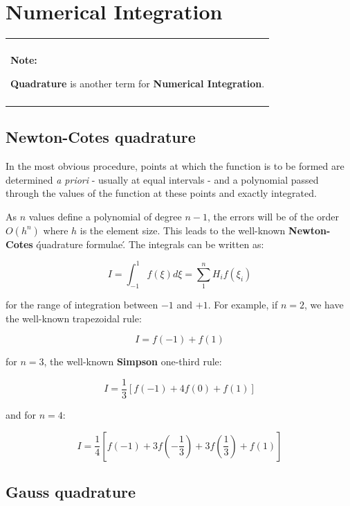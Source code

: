 \documentclass[10pt,b5paper,titlepage]{book}
\newenvironment{bbox}[1][0.96]
{
    \begin{center}
        \begin{tabular}{|p{#1\textwidth}|}
            \hline\\
}
{
            \\\\\hline
        \end{tabular}
    \end{center}
}
\begin{document}
\section{Numerical Integration}

\begin{bbox}
    \textbf{Note:}

    \textbf{Quadrature} is another term for \textbf{Numerical Integration}.
\end{bbox}


\subsection{Newton-Cotes quadrature}
In the most obvious procedure, points at which the function is to be formed are
determined \textit{a priori} - usually at equal intervals - and a polynomial
passed through the values of the function at these points and exactly integrated.

As $ n $ values define a polynomial of degree $ n - 1 $, the errors will be
of the order $ O(h^n) $ where $ h $ is the element size. This leads to the
well-known \textbf{Newton-Cotes} \'quadrature formulae\'. The integrals can be
written as:

\begin{equation}
    I = \int_{-1}^{1} f(\xi) d\xi = \sum_1^n H_i f(\xi_i)
\end{equation}

for the range of integration between $ -1 $ and $ +1 $. For example, if $ n = 2 $,
we have the well-known trapezoidal rule:

\begin{equation}
    I = f(-1) + f(1)
\end{equation}

for $ n = 3 $, the well-known \textbf{Simpson} one-third rule:

\begin{equation}
    I = \frac{1}{3} \left[ f(-1) + 4f(0) + f(1) \right]
\end{equation}

and for $ n = 4 $:

\begin{equation}
    I = \frac{1}{4} \left[f(-1) + 3f(-\frac{1}{3}) + 3f(\frac{1}{3}) + f(1) \right]
\end{equation}


\subsection{Gauss quadrature}
\end{document}
